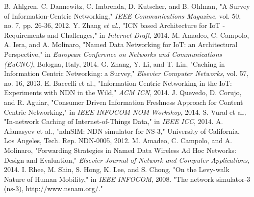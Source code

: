 \documentclass[conference]{IEEEtran}
\begin{document}
\begin{thebibliography}{00}
 B. Ahlgren, C. Dannewitz, C. Imbrenda, D. Kutscher, and B. Ohlman, "A Survey of Information-Centric Networking," \textit{IEEE Communications Magazine}, vol. 50, no. 7, pp. 26-36, 2012.
 Y. Zhang \textit{et al.}, "ICN based Architecture for IoT - Requirements and Challenges," in \textit{Internet-Draft}, 2014.
 M. Amadeo, C. Campolo, A. Iera, and A. Molinaro, "Named Data Networking for IoT: an Architectural Perspective," in \textit{European Conference on Networks and Communications (EuCNC)}, Bologna, Italy, 2014.
 G. Zhang, Y. Li, and T. Lin, "Caching in Information Centric Networking: a Survey," \textit{Elsevier Computer Networks}, vol. 57, no. 16, 2013.
 E. Baccelli et al., "Information Centric Networking in the IoT: Experiments with NDN in the Wild," \textit{ACM ICN}, 2014.
 J. Quevedo, D. Corujo, and R. Aguiar, "Consumer Driven Information Freshness Approach for Content Centric Networking," in \textit{IEEE INFOCOM NOM Workshop}, 2014.
 S. Vural et al., "In-network Caching of Internet-of-Things Data," in \textit{IEEE ICC}, 2014.
 A. Afanasyev et al., "ndnSIM: NDN simulator for NS-3," University of California, Los Angeles, Tech. Rep. NDN-0005, 2012.
 M. Amadeo, C. Campolo, and A. Molinaro, "Forwarding Strategies in Named Data Wireless Ad Hoc Networks: Design and Evaluation," \textit{Elsevier Journal of Network and Computer Applications}, 2014.
 I. Rhee, M. Shin, S. Hong, K. Lee, and S. Chong, "On the Levy-walk Nature of Human Mobility," in \textit{IEEE INFOCOM}, 2008.
 "The network simulator-3 (ns-3), http://www.nsnam.org/."
\end{thebibliography}
\vspace{12pt}
\color{red}
\end{document}
